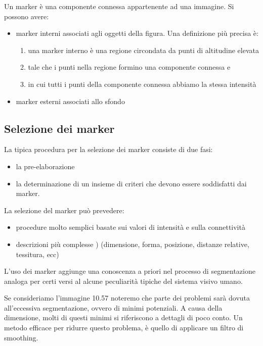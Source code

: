 Un marker è una componente connessa appartenente ad una immagine. Si possono avere:
\begin{itemize}
	\item marker interni associati agli oggetti della figura. Una definizione più precisa è:
	\begin{enumerate}
		\item una marker interno è una regione circondata da punti di altitudine elevata
		\item tale che i punti nella regione formino una componente connessa e
		\item in cui tutti i punti della componente connessa abbiamo la stessa intensità
	\end{enumerate}
	
	\item marker esterni associati allo sfondo
\end{itemize}

\subsection{Selezione dei marker}
La tipica procedura per la selezione dei marker consiste di due fasi:
\begin{itemize}
	\item la pre-elaborazione
	\item la determinazione di un insieme di criteri che devono essere soddisfatti dai marker.
\end{itemize}

La selezione del marker può prevedere:
\begin{itemize}
	\item procedure molto semplici basate sui valori di intensità e sulla connettività
	
	\item descrizioni più complesse )
	(dimensione, forma, posizione, distanze relative, tessitura, ecc)
\end{itemize}

L'uso dei marker aggiunge una conoscenza a priori nel processo di segmentazione analoga per certi versi al alcune peculiarità tipiche del sistema visivo umano.

Se consideriamo l'immagine 10.57 noteremo che parte dei problemi sarà dovuta all'eccessiva segmentazione, ovvero di minimi potenziali. A causa della dimensione, molti di questi minimi si riferiscono a dettagli di poco conto. Un metodo efficace per ridurre questo problema, è quello di applicare un filtro di smoothing.

